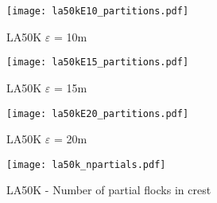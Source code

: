 \documentclass[a4paper,10pt]{article}
\begin{document}
\begin{figure}[h!]
 \centering
 \texttt{[image: la50kE10\_partitions.pdf]}
 \caption{LA50K $\varepsilon$ = 10m}
 \label{fig:la50k10}
\end{figure}

\begin{figure}[h!]
 \centering
 \texttt{[image: la50kE15\_partitions.pdf]}
 \caption{LA50K $\varepsilon$ = 15m}
 \label{fig:la50k15}
\end{figure}

\begin{figure}[h!]
 \centering
 \texttt{[image: la50kE20\_partitions.pdf]}
 \caption{LA50K $\varepsilon$ = 20m}
 \label{fig:la50k20}
\end{figure}

\begin{figure}[h!]
 \centering
 \texttt{[image: la50k\_npartials.pdf]}
 \caption{LA50K - Number of partial flocks in crest}
 \label{fig:la50k_partials}
\end{figure}
\end{document}

